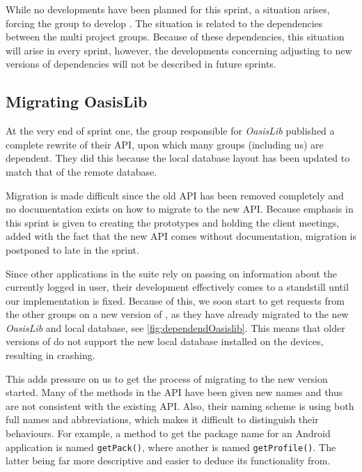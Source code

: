 While no developments have been planned for this sprint, a situation arises, forcing the group to develop \launcher.
The situation is related to the dependencies between the multi project groups.
Because of these dependencies, this situation will arise in every sprint, however, the developments concerning adjusting to new versions of dependencies will not be described in future sprints.

\subsection{Migrating OasisLib}\label{sec:oasismigration}
At the very end of sprint one, the group responsible for \textit{OasisLib} published a complete rewrite of their API, upon which many groups (including us) are dependent.
They did this because the local database layout has been updated to match that of the remote database.

Migration is made difficult since the old API has been removed completely and no documentation exists on how to migrate to the new API.
Because emphasis in this sprint is given to creating the prototypes and holding the client meetings, added with the fact that the new API comes without documentation, migration is postponed to late in the sprint.

Since other applications in the \giraf suite rely on \launcher passing on information about the currently logged in user, their development effectively comes to a standstill until our implementation is fixed.
Because of this, we soon start to get requests from the other groups on a new version of \launcher, as they have already migrated to the new \textit{OasisLib} and local database, see \cref{fig:dependendOasislib}.
This means that older versions of \launcher do not support the new local database installed on the devices, resulting in \launcher crashing.


This adds pressure on us to get the process of migrating to the new version started.
Many of the methods in the API have been given new names and thus are not consistent with the existing API.
Also, their naming scheme is using both full names and abbreviations, which makes it difficult to distinguish their behaviours.
For example, a method to get the package name for an Android application is named \lstinline{getPack()}, where another is named \lstinline{getProfile()}.
The latter being far more descriptive and easier to deduce its functionality from.

